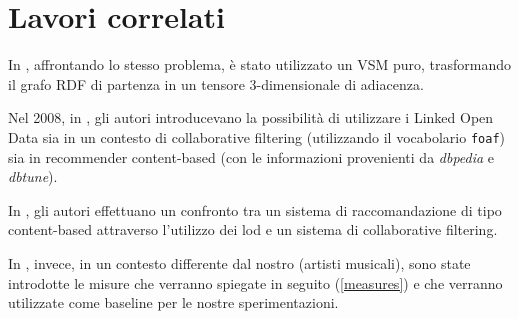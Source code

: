 \section{Lavori correlati}
\label{relatedworks}

In \citet{mirizzilinked}, affrontando lo stesso problema, è stato utilizzato un VSM puro, trasformando il grafo RDF di partenza in un tensore 3-dimensionale di adiacenza.

Nel 2008, in \citet{passant2008combining}, gli autori introducevano la possibilità di utilizzare i Linked Open Data sia in un contesto di collaborative filtering (utilizzando il vocabolario \verb+foaf+) sia in recommender content-based (con le informazioni provenienti da \emph{dbpedia} e \emph{dbtune}).

In \citet{passant2009using}, gli autori effettuano un confronto tra un sistema di raccomandazione di tipo content-based attraverso l'utilizzo dei lod e un sistema di collaborative filtering.

In \citet{passant2010measuring}, invece, in un contesto differente dal nostro (artisti musicali), sono state introdotte le misure che verranno spiegate in seguito (\ref{measures}) e che verranno utilizzate come baseline per le nostre sperimentazioni. 

\nocite{freitas2012distributional}




\nocite{thalhammer2012leveraging}
